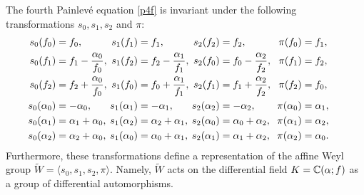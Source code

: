 \begin{thm}\label{BT}
The fourth Painlev\'e equation \eqref{p4f} is invariant under the 
following transformations $s_0,s_1,s_2$ and $\pi$: 
\begin{equation}
\begin{aligned}
s_0(f_0)&=f_0, \\
s_0(f_1)&=f_1-{\alpha_0 \over f_0}, \\
s_0(f_2)&=f_2+{\alpha_0 \over f_0}, \\
s_0(\alpha_0)&=-\alpha_0, \\
s_0(\alpha_1)&=\alpha_1+\alpha_0, \\
s_0(\alpha_2)&=\alpha_2+\alpha_0,
\end{aligned}
\ 
\begin{aligned}
s_1(f_1)&=f_1, \\
s_1(f_2)&=f_2-{\alpha_1 \over f_1}, \\
s_1(f_0)&=f_0+{\alpha_1 \over f_1}, \\
s_1(\alpha_1)&=-\alpha_1, \\
s_1(\alpha_2)&=\alpha_2+\alpha_1, \\
s_1(\alpha_0)&=\alpha_0+\alpha_1,
\end{aligned}
\ 
\begin{aligned}
s_2(f_2)&=f_2, \\
s_2(f_0)&=f_0-{\alpha_2 \over f_2}, \\
s_2(f_1)&=f_1+{\alpha_2 \over f_2}, \\
s_2(\alpha_2)&=-\alpha_2, \\
s_2(\alpha_0)&=\alpha_0+\alpha_2, \\
s_2(\alpha_1)&=\alpha_1+\alpha_2,
\end{aligned}
\ \ 
\begin{aligned}
\pi(f_0)&=f_1, \\
\pi(f_1)&=f_2, \phantom{{\alpha_1 \over f}}\\
\pi(f_2)&=f_0,\phantom{{\alpha_1 \over f}} \\
\pi(\alpha_0)&=\alpha_1, \\
\pi(\alpha_1)&=\alpha_2, \\
\pi(\alpha_2)&=\alpha_0.
\end{aligned}
\label{transf}
\end{equation}
Furthermore, these transformations define a representation of 
the affine Weyl group $\widetilde{W}=\langle s_0,s_1,s_2,\pi\rangle$.  
Namely, $\widetilde{W}$ acts on the differential field 
$K={\Bbb C}(\alpha;f)$ as a group of differential automorphisms. 
\end{thm}
